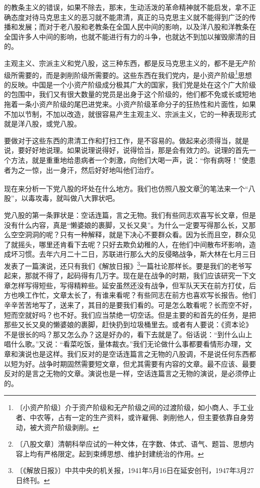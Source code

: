 \documentclass[12pt,UTF-8,openany]{ctexbook}
\begin{document}
\begin{large}
的教条主义的错误，如果不除去，那末，生动活泼的革命精神就不能启发，拿不正确态度对待马克思主义的恶习就不能肃清，真正的马克思主义就不能得到广泛的传播和发展；而对于老八股和老教条在全国人民中间的影响，以及洋八股和洋教条在全国许多人中间的影响，也就不能进行有力的斗争，也就达不到加以摧毁廓清的目的。
    
    主观主义、宗派主义和党八股，这三种东西，都是反马克思主义的，都不是无产阶级所需要的，而是剥削阶级所需要的。这些东西在我们党内，是小资产阶级\footnote{〔小资产阶级〕介于资产阶级和无产阶级之间的过渡阶级，如小商人、手工业者、中农等，占有一定的生产资料，或许雇佣、剥削他人，但主要依靠自身劳动，被大资产阶级剥削。}思想的反映。中国是一个小资产阶级成分极其广大的国家，我们党是处在这个广大阶级的包围中，我们又有很大数量的党员是出身于这个阶级的，他们都不免或长或短地拖着一条小资产阶级的尾巴进党来。小资产阶级革命分子的狂热性和片面性，如果不加以节制，不加以改造，就很容易产生主观主义、宗派主义，它的一种表现形式就是洋八股，或党八股。
    
    要做对于这些东西的肃清工作和打扫工作，是不容易的。做起来必须得当，就是说，要好好地说理。如果说理说得好，说得恰当，那是会有效力的。说理的首先一个方法，就是重重地给患病者一个刺激，向他们大喝一声，说：“你有病呀！”使患者为之一惊，出一身汗，然后好好地叫他们治疗。
    
    现在来分析一下党八股的坏处在什么地方。我们也仿照八股文章\footnote{〔八股文章〕清朝科举应试的一种文体，在字数、体式、语气、题旨、思想内容上均有严格限定。起到束缚思想、维护封建统治的作用。}的笔法来一个“八股”，以毒攻毒，就叫做八大罪状吧。
    
    党八股的第一条罪状是：空话连篇，言之无物。我们有些同志欢喜写长文章，但是没有什么内容，真是“懒婆娘的裹脚，又长又臭”。为什么一定要写得那么长，又那么空空洞洞的呢？只有一种解释，就是下决心不要群众看。因为长而且空，群众见了就摇头，哪里还肯看下去呢？只好去欺负幼稚的人，在他们中间散布坏影响，造成坏习惯。去年六月二十二日，苏联进行那么大的反侵略战争，斯大林在七月三日发表了一篇演说，还只有我们《解放日报》\footnote{〔《解放日报》〕中共中央的机关报，1941年5月16日在延安创刊，1947年3月27日终刊。}一篇社论那样长。要是我们的老爷写起来，那就不得了，起码得有几万字。现在是在战争的时期，我们应该研究一下文章怎样写得短些，写得精粹些。延安虽然还没有战争，但军队天天在前方打仗，后方也唤工作忙，文章太长了，有谁来看呢？有些同志在前方也喜欢写长报告。他们辛辛苦苦地写了，送来了，其目的是要我们看的。可是怎么敢看呢？长而空不好，短而空就好吗？也不好。我们应当禁绝一切空话。但是主要的和首先的任务，是把那些又长又臭的懒婆娘的裹脚，赶快扔到垃圾桶里去。或者有人要说：《资本论》不是很长的吗？那又怎么办？这是好办的，看下去就是了。俗话说：“到什么山上唱什么歌。”又说：“看菜吃饭，量体裁衣。”我们无论做什么事都要看情形办理，文章和演说也是这样。我们反对的是空话连篇言之无物的八股调，不是说任何东西都以短为好。战争时期固然需要短文章，但尤其需要有内容的文章。最不应该、最要反对的是言之无物的文章。演说也是一样，空话连篇言之无物的演说，是必须停止的。
    

\end{large}
\end{document}
